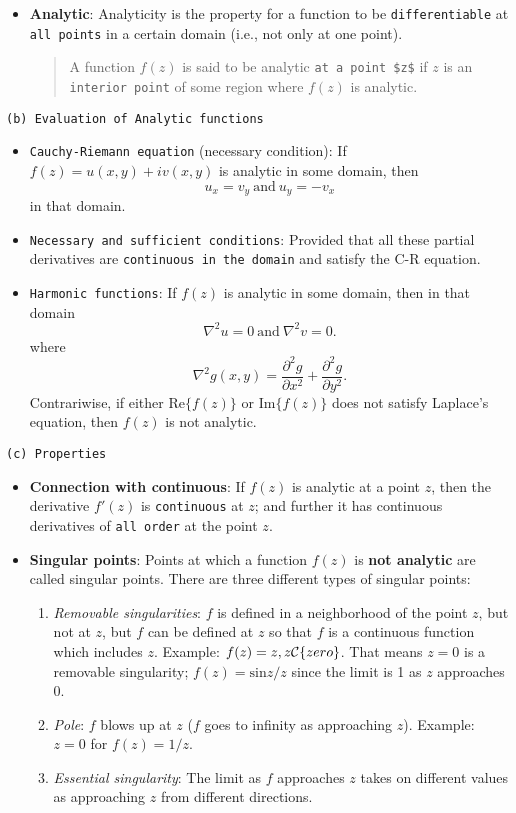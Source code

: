 \begin{itemize}
\item \textbf{Analytic}: Analyticity is the property for a function to be \verb|differentiable| at \verb|all points| in a certain domain (i.e., not only at one point).
\begin{quote}
A function $f(z)$ is said to be analytic \verb|at a point $z$| if $z$ is an \verb|interior point| of some region where $f(z)$ is analytic.
\end{quote}
\end{itemize}
\verb|(b) Evaluation of Analytic functions|
\begin{itemize}
\item \verb|Cauchy-Riemann equation| (necessary condition): If $f(z) = u(x,y) + iv(x,y)$ is analytic in some domain, then 
$$
u_x = v_y\ \mathrm{and}\ u_y = -v_x
$$ in that domain. 
\item \verb|Necessary and sufficient conditions|: Provided that all these partial derivatives are \verb|continuous in the domain| and satisfy the C-R equation.
\item \verb|Harmonic functions|: If $f(z)$ is analytic in some domain, then in that domain
$$
\nabla^2u = 0\ \mathrm{and}\ \nabla^2v = 0.
$$ where
$$
\nabla^2 g(x,y) = \frac{\partial^2 g}{\partial x^2} + \frac{\partial^2 g}{\partial y^2}.
$$ Contrariwise, if either $\mathrm{Re}\{f(z)\}$ or $\mathrm{Im}\{f(z)\}$ does not satisfy Laplace's equation, then $f(z)$ is not analytic.
\end{itemize}
\verb|(c) Properties|
\begin{itemize}
\item \textbf{Connection with continuous}: If $f(z)$ is analytic at a point $z$, then the derivative $f'(z)$ is \verb|continuous| at $z$; and further it has continuous derivatives of \verb|all order| at the point $z$.
\item \textbf{Singular points}: Points at which a function $f(z)$ is \textbf{not analytic} are called singular points. There are three different types of singular points:
\begin{enumerate}
\item \textit{Removable singularities}: $f$ is defined in a neighborhood of the point $z$, but not at $z$, but $f$ can be defined at $z$ so that $f$ is a continuous function which includes $z$. Example: $f(z) = z, z \mathcal{C}\\\{zero\}$. That means $z=0$ is a removable singularity; $f(z) = \mathrm{sin} z/z$ since the limit is 1 as $z$ approaches 0.
\item \textit{Pole}: $f$ blows up at $z$ ($f$ goes to infinity as approaching $z$). Example: $z=0$ for $f(z) = 1/z$.
\item \textit{Essential singularity}: The limit as $f$ approaches $z$ takes on different values as approaching $z$ from different directions. 
\end{enumerate}
\end{itemize}

